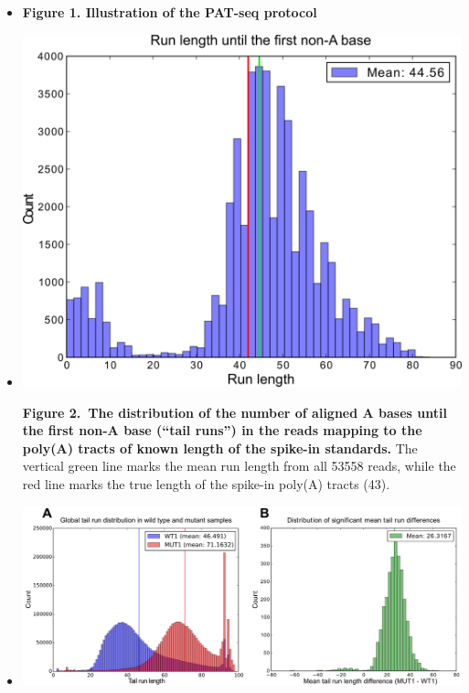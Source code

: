 \documentclass[10pt]{article}
\begin{document}
\begin{itemize}

\item[]{




\textbf{Figure 1. Illustration of the PAT-seq protocol}
}








\item[]{
\includegraphics[scale=0.8]{Figure2.png}

\textbf{Figure 2.~The distribution of the number of aligned A bases until the first non-A base (``tail runs'') in the reads mapping to the poly(A) tracts of known length of the spike-in standards.} The vertical green line marks the mean run length from all 53558 reads, while the red line marks the true length of the spike-in poly(A) tracts (43).}




\item[]{
\includegraphics[scale=0.8]{Figure3.png}




}
\end{itemize}
\end{document}
